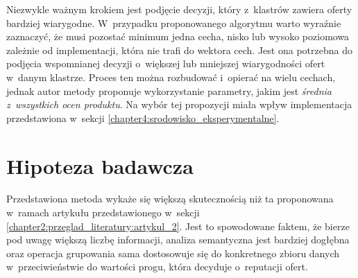 \documentclass[../Kamil_Kowalewski_Main.tex]{subfiles}
\begin{document}
{{        Niezwykle ważnym krokiem jest podjęcie decyzji, który z~klastrów zawiera oferty
        bardziej wiarygodne. W~przypadku proponowanego algorytmu warto wyraźnie
        zaznaczyć, że musi pozostać minimum jedna cecha, nisko lub wysoko poziomowa
        zależnie od implementacji, która nie trafi do wektora cech. Jest ona potrzebna
        do podjęcia wspomnianej decyzji o~większej lub mniejszej wiarygodności ofert
        w~danym klastrze. Proces ten można rozbudować i~opierać na wielu cechach, jednak
        autor metody proponuje wykorzystanie parametry, jakim jest
        \textit{średnia z~wszystkich ocen produktu}. Na wybór tej propozycji miała wpływ
        implementacja przedstawiona w~sekcji \ref{chapter4:srodowisko_eksperymentalne}.

    }

    \section{Hipoteza badawcza}
    \label{chapter3:metoda:hipoteza} {
        Przedstawiona metoda wykaże się większą skutecznością niż ta proponowana
        w~ramach artykułu przedstawionego w~sekcji
        \ref{chapter2:przeglad_literatury:artykul_2}. Jest to spowodowane faktem, że
        bierze pod uwagę większą liczbę informacji, analiza semantyczna jest bardziej
        dogłębna oraz operacja grupowania sama dostosowuje się do konkretnego zbioru
        danych w~przeciwieństwie do wartości progu, która decyduje o~reputacji ofert.
    }

}
\end{document}
